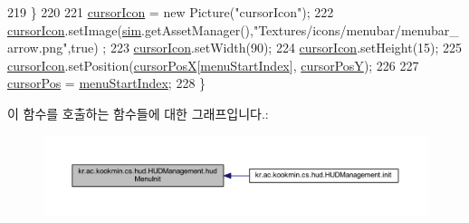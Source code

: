 \begin{DoxyCode}
219     \}
220 
221     \hyperlink{classkr_1_1ac_1_1kookmin_1_1cs_1_1hud_1_1_h_u_d_management_a8bd64fe62e6e91c9bd83a274eb59faa9}{cursorIcon} = \textcolor{keyword}{new} Picture(\textcolor{stringliteral}{"cursorIcon"});
222     \hyperlink{classkr_1_1ac_1_1kookmin_1_1cs_1_1hud_1_1_h_u_d_management_a8bd64fe62e6e91c9bd83a274eb59faa9}{cursorIcon}.setImage(\hyperlink{classkr_1_1ac_1_1kookmin_1_1cs_1_1hud_1_1_h_u_d_management_abcbcea66aba5169a6d07c407d1e3c86d}{sim}.getAssetManager(),\textcolor{stringliteral}{"Textures/icons/menubar/menubar\_arrow.png"},\textcolor{keyword}{true})
      ;
223     \hyperlink{classkr_1_1ac_1_1kookmin_1_1cs_1_1hud_1_1_h_u_d_management_a8bd64fe62e6e91c9bd83a274eb59faa9}{cursorIcon}.setWidth(90);
224     \hyperlink{classkr_1_1ac_1_1kookmin_1_1cs_1_1hud_1_1_h_u_d_management_a8bd64fe62e6e91c9bd83a274eb59faa9}{cursorIcon}.setHeight(15);
225     \hyperlink{classkr_1_1ac_1_1kookmin_1_1cs_1_1hud_1_1_h_u_d_management_a8bd64fe62e6e91c9bd83a274eb59faa9}{cursorIcon}.setPosition(\hyperlink{classkr_1_1ac_1_1kookmin_1_1cs_1_1hud_1_1_h_u_d_management_a62b6b5ec5cb0eae74acaacccd2c3bee6}{cursorPosX}[\hyperlink{classkr_1_1ac_1_1kookmin_1_1cs_1_1hud_1_1_h_u_d_management_ab9d252f0b80e76c4930b8e0fd288f019}{menuStartIndex}], 
      \hyperlink{classkr_1_1ac_1_1kookmin_1_1cs_1_1hud_1_1_h_u_d_management_a1bc74f45485b6a429e54e8be6a66b6b1}{cursorPosY});
226 
227     \hyperlink{classkr_1_1ac_1_1kookmin_1_1cs_1_1hud_1_1_h_u_d_management_a138d02aacf241cd6234acfc9512f78aa}{cursorPos} = \hyperlink{classkr_1_1ac_1_1kookmin_1_1cs_1_1hud_1_1_h_u_d_management_ab9d252f0b80e76c4930b8e0fd288f019}{menuStartIndex};      
228   \}
\end{DoxyCode}


이 함수를 호출하는 함수들에 대한 그래프입니다.\+:\nopagebreak
\begin{figure}[H]
\begin{center}
\leavevmode
\includegraphics[width=350pt]{classkr_1_1ac_1_1kookmin_1_1cs_1_1hud_1_1_h_u_d_management_ae556ec9b1e304f6b7ac343d19186b31e_icgraph}
\end{center}
\end{figure}


\hypertarget{classkr_1_1ac_1_1kookmin_1_1cs_1_1hud_1_1_h_u_d_management_a09bdb891071027c0834bb5e300dbd530}{}

